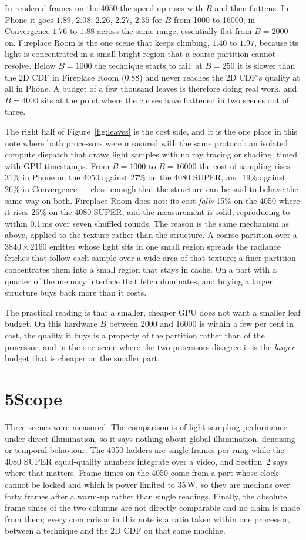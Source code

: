 \documentclass[10pt]{article}
\begin{document}
In rendered frames on the 4050 the speed-up rises with $B$ and then flattens. In Phone it goes
$1.89$, $2.08$, $2.26$, $2.27$, $2.35$ for $B$ from 1000 to 16000; in Convergence $1.76$ to $1.88$
across the same range, essentially flat from $B=2000$ on. Fireplace Room is the one scene that keeps
climbing, $1.40$ to $1.97$, because its light is concentrated in a small bright region that a coarse
partition cannot resolve. Below $B=1000$ the technique starts to fail: at $B=250$ it is slower than
the 2D CDF in Fireplace Room ($0.88$) and never reaches the 2D CDF's quality at all in Phone. A
budget of a few thousand leaves is therefore doing real work, and $B=4000$ sits at the point where
the curves have flattened in two scenes out of three.

The right half of Figure~\ref{fig:leaves} is the cost side, and it is the one place in this note
where both processors were measured with the same protocol: an isolated compute dispatch that draws
light samples with no ray tracing or shading, timed with GPU timestamps. From $B=1000$ to
$B=16000$ the cost of sampling rises 31\% in Phone on the 4050 against 27\% on the 4080 SUPER, and
19\% against 26\% in Convergence --- close enough that the structure can be said to behave the same
way on both. Fireplace Room does not: its cost \emph{falls} 15\% on the 4050 where it rises 26\% on
the 4080 SUPER, and the measurement is solid, reproducing to within 0.1\,ms over seven shuffled
rounds. The reason is the same mechanism as above, applied to the texture rather than the structure.
A coarse partition over a $3840\times2160$ emitter whose light sits in one small region spreads the
radiance fetches that follow each sample over a wide area of that texture; a finer partition
concentrates them into a small region that stays in cache. On a part with a quarter of the memory
interface that fetch dominates, and buying a larger structure buys back more than it costs.

The practical reading is that a smaller, cheaper GPU does not want a smaller leaf budget. On this
hardware $B$ between 2000 and 16000 is within a few per cent in cost, the quality it buys is a
property of the partition rather than of the processor, and in the one scene where the two
processors disagree it is the \emph{larger} budget that is cheaper on the smaller part.

\section*{5\quad Scope}

Three scenes were measured. The comparison is of light-sampling performance under
direct illumination, so it says nothing about global illumination, denoising or temporal behaviour.
The 4050 ladders are single frames per rung while the 4080 SUPER equal-quality numbers integrate
over a video, and Section~2 says where that matters. Frame times on the 4050 come from a part whose
clock cannot be locked and which is power limited to 35\,W, so they are medians over forty frames
after a warm-up rather than single readings. Finally, the absolute frame times of the two columns
are not directly comparable and no claim is made from them; every comparison in this note is a ratio
taken within one processor, between a technique and the 2D CDF on that same machine.
\end{document}
